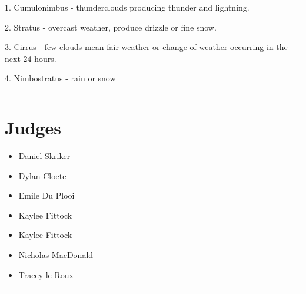 \documentclass[10pt]{article}
\begin{document}
1. Cumulonimbus - thunderclouds producing thunder and lightning. 

2. Stratus - overcast weather, produce drizzle or fine snow.

3. Cirrus - few clouds mean fair weather or change of weather occurring in the next 24 hours.

4. Nimbostratus - rain or snow
\vspace{0.5cm}
	\hrule
	\vspace{0.5cm}
		\section*{\faUsers \: Judges}

		

	\begin{multicols}{2}

		\begin{itemize}
									\item Daniel Skriker
									\item Dylan Cloete
									\item Emile Du Plooi
									\item Kaylee Fittock
						\end{itemize}

		\vfill\null
		\columnbreak

		\begin{itemize}
									\item Kaylee Fittock
									\item Nicholas MacDonald
									\item Tracey le Roux
						\end{itemize}

		\vfill\null

		\end{multicols}



			\vspace{0.5cm}
	\hrule
	\vspace{0.5cm}
\end{document}
